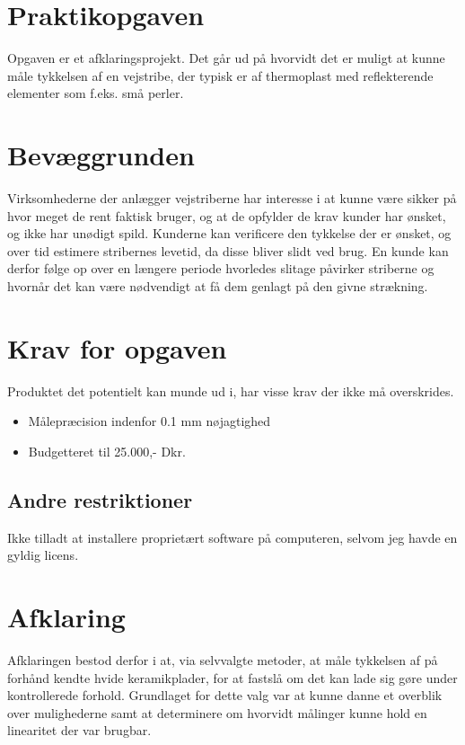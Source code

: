 \section{Praktikopgaven}
Opgaven er et afklaringsprojekt. Det går ud på hvorvidt det er muligt at kunne måle tykkelsen af en vejstribe, der typisk er af thermoplast med reflekterende elementer som f.eks. små perler.

\section{Bevæggrunden}
Virksomhederne der anlægger vejstriberne har interesse i at kunne være sikker på hvor meget de rent faktisk bruger, og at de opfylder de krav kunder har ønsket, og ikke har unødigt spild. Kunderne kan verificere den tykkelse der er ønsket, og over tid estimere stribernes levetid, da disse bliver slidt ved brug. En kunde kan derfor følge op over en længere periode hvorledes slitage påvirker striberne og hvornår det kan være nødvendigt at få dem genlagt på den givne strækning.

\section{Krav for opgaven}
Produktet det potentielt kan munde ud i, har visse krav der ikke må overskrides.

\begin{itemize}
	\item Målepræcision indenfor 0.1 mm nøjagtighed
	\item Budgetteret til 25.000,- Dkr.
\end{itemize}

\subsection{Andre restriktioner}
Ikke tilladt at installere proprietært software på computeren, selvom jeg havde en gyldig licens.

\section{Afklaring}
Afklaringen bestod derfor i at, via selvvalgte metoder, at måle tykkelsen af på forhånd kendte hvide keramikplader, for at fastslå om det kan lade sig gøre under kontrollerede forhold. Grundlaget for dette valg var at kunne danne et overblik over mulighederne samt at determinere om hvorvidt målinger kunne hold en linearitet der var brugbar.

